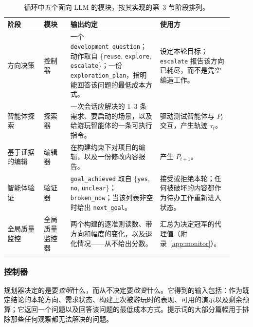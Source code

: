 \begin{table}[t]
\caption{\rsig{} 循环中五个面向 LLM 的模块，按其实现的第~3 节阶段排列。}
\label{tab:modules}
\centering\footnotesize
\begin{tabular}{@{}p{0.15\linewidth}p{0.11\linewidth}p{0.36\linewidth}p{0.3\linewidth}@{}}
\toprule
阶段 & 模块 & 输出约定 & 使用方 \\
\midrule
方向决策 & 控制器 & 一个 \texttt{development\_question}；动作取自 \{\texttt{reuse}, \texttt{explore}, \texttt{escalate}\}；一份 \texttt{exploration\_plan}，指明能回答该问题的最低成本方式。 & 设定本轮目标；\texttt{escalate} 报告该方向已耗尽，而不是凭空编造工作。 \\
智能体探索 & 探索器 & 一次会话应解决的 1–3 条需求、要启动的场景，以及给游玩智能体的一条可执行指令。 & 驱动测试智能体与 $P_t$ 交互，产生轨迹 $\tau_t$。 \\
基于证据的编辑 & 编辑器 & 在构建约束下对项目的编辑，以及一份修改内容报告。 & 产生 $P_{t+1}$。 \\
智能体验证 & 验证器 & \texttt{goal\_achieved} 取自 \{\texttt{yes}, \texttt{no}, \texttt{unclear}\}；\texttt{broken\_now}；当该列表非空时给出 \texttt{next\_goal}。 & 接受或拒绝本轮；任何被破坏的内容都作为待办工作重新进入状态。 \\
全局质量监控 & 全局质量监控器 & 两个构建的逐准则读数、带方向和幅度的变化，以及退化情况——从不给出分数。 & 汇总为决定冠军的代理值（附录~\ref{app:monitor}）。 \\
\bottomrule
\end{tabular}
\end{table}

\subsubsection{控制器}
规划器决定的是要\emph{查明}什么，而从不决定要\emph{改变}什么。它得到的输入包括：作为既定结论的本轮方向、需求状态、构建上次被游玩时的表现、可用的演示以及剩余预算；它返回一个问题以及回答该问题的最低成本方式。提示词的大部分篇幅用于排除那些任何观察都无法解决的问题。

